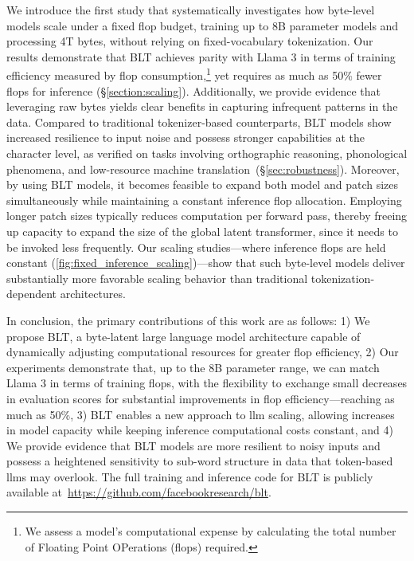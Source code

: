 We introduce the first study that systematically investigates how byte-level models scale under a fixed flop budget, training up to 8B parameter models and processing 4T bytes, without relying on fixed-vocabulary tokenization. Our results demonstrate that {\textsc BLT} achieves parity with Llama 3 in terms of training efficiency measured by flop consumption,\footnote{We assess a model’s computational expense by calculating the total number of Floating Point OPerations (flops) required.} yet requires as much as 50\% fewer flops for inference (\S\ref{section:scaling}).
Additionally, we provide evidence that leveraging raw bytes yields clear benefits in capturing infrequent patterns in the data. Compared to traditional tokenizer-based counterparts, {\textsc BLT} models show increased resilience to input noise and possess stronger capabilities at the character level, as verified on tasks involving orthographic reasoning, phonological phenomena, and low-resource machine translation~(\S\ref{sec:robustness}).
Moreover, by using {\textsc BLT} models, it becomes feasible to expand both model and patch sizes simultaneously while maintaining a constant inference flop allocation. Employing longer patch sizes typically reduces computation per forward pass, thereby freeing up capacity to expand the size of the global latent transformer, since it needs to be invoked less frequently. Our scaling studies—where inference flops are held constant (\autoref{fig:fixed_inference_scaling})—show that such byte-level models deliver substantially more favorable scaling behavior than traditional tokenization-dependent architectures.

In conclusion, the primary contributions of this work are as follows: 1) We propose {\textsc BLT}, a byte-latent large language model architecture capable of dynamically adjusting computational resources for greater flop efficiency, 2) Our experiments demonstrate that, up to the 8B parameter range, we can match Llama 3 in terms of training flops, with the flexibility to exchange small decreases in evaluation scores for substantial improvements in flop efficiency—reaching as much as 50\%, 3) {\textsc BLT} enables a new approach to llm scaling, allowing increases in model capacity while keeping inference computational costs constant, and 4) We provide evidence that {\textsc BLT} models are more resilient to noisy inputs and possess a heightened sensitivity to sub-word structure in data that token-based llms may overlook. The full training and inference code for {\textsc BLT} is publicly available at~\url{https://github.com/facebookresearch/blt}.

